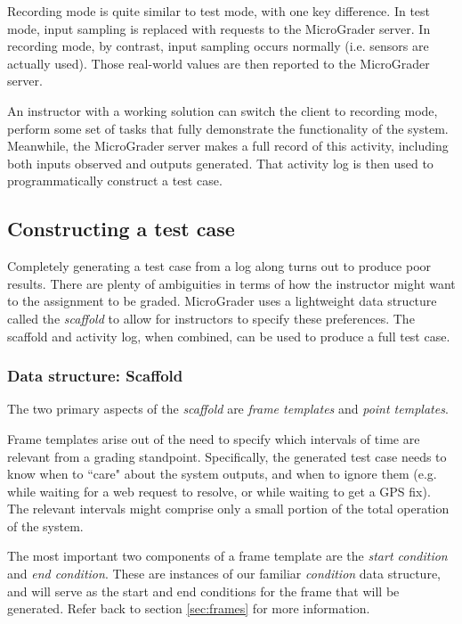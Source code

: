 \documentclass[12pt]{article}
\begin{document}
Recording mode is quite similar to test mode, with one key difference.  In test mode, input sampling is replaced with requests to the MicroGrader server.  In recording mode, by contrast, input sampling occurs normally (i.e. sensors are actually used).  Those real-world values are then reported to the MicroGrader server.

An instructor with a working solution can switch the client to recording mode, perform some set of tasks that fully demonstrate the functionality of the system.  Meanwhile, the MicroGrader server makes a full record of this activity, including both inputs observed and outputs generated.  That activity log is then used to programmatically construct a test case.

\subsection{Constructing a test case}
Completely generating a test case from a log along turns out to produce poor results.  There are plenty of ambiguities in terms of how the instructor might want to the assignment to be graded.  MicroGrader uses a lightweight data structure called the \textit{scaffold} to allow for instructors to specify these preferences.  The scaffold and activity log, when combined, can be used to produce a full test case.

\subsubsection{Data structure: Scaffold}
The two primary aspects of the \textit{scaffold} are \textit{frame templates} and \textit{point templates}.

Frame templates arise out of the need to specify which intervals of time are relevant from a grading standpoint.  Specifically, the generated test case needs to know when to ``care" about the system outputs, and when to ignore them (e.g. while waiting for a web request to resolve, or while waiting to get a GPS fix).  The relevant intervals might comprise only a small portion of the total operation of the system.

The most important two components of a frame template are the \textit{start condition} and \textit{end condition}.  These are instances of our familiar \textit{condition} data structure, and will serve as the start and end conditions for the frame that will be generated.  Refer back to section \ref{sec:frames} for more information.
\end{document}
